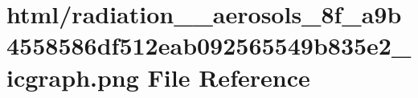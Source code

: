 \hypertarget{radiation____aerosols__8f__a9b4558586df512eab092565549b835e2__icgraph_8png}{}\section{html/radiation\+\_\+\+\_\+aerosols\+\_\+8f\+\_\+a9b4558586df512eab092565549b835e2\+\_\+icgraph.png File Reference}
\label{radiation____aerosols__8f__a9b4558586df512eab092565549b835e2__icgraph_8png}

